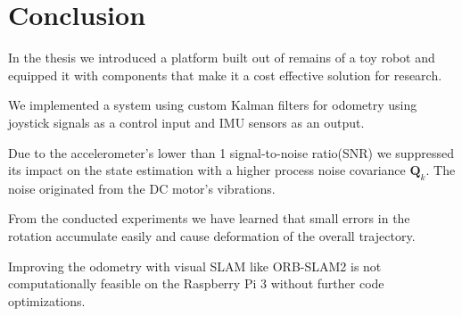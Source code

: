\documentclass[class=report, crop=false]{standalone}
\begin{document}
\chapter{Conclusion}\label{cha:conclusion}

In the thesis we introduced a platform built out of remains of a toy robot and equipped it with components that make it a cost effective solution for research.

We implemented a system using custom Kalman filters for odometry using joystick signals as a control input and IMU sensors as an output.

Due to the accelerometer's lower than 1 signal-to-noise ratio(SNR) we suppressed its impact on the state estimation with a higher process noise covariance $\textbf{Q}_k$. The noise originated from the DC motor's vibrations.

From the conducted experiments we have learned that small errors in the rotation accumulate easily and cause deformation of the overall trajectory.

Improving the odometry with visual SLAM like ORB-SLAM2\cite{mur2017orb} is not computationally feasible on the Raspberry Pi 3 without further code optimizations.
\end{document}
